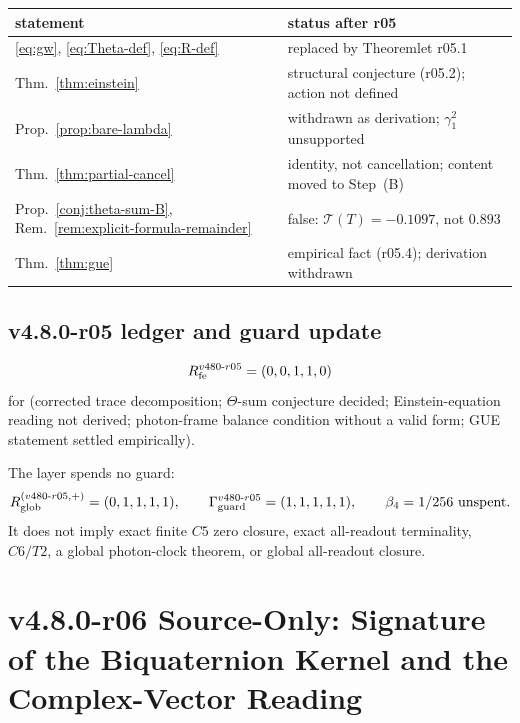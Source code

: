 \begin{center}
\small
\begin{tabular}{@{}>{\raggedright\arraybackslash}p{}>{\raggedright\arraybackslash}p{}@{}}
\toprule
statement & status after r05\\
\midrule
\eqref{eq:gw}, \eqref{eq:Theta-def}, \eqref{eq:R-def} & replaced by Theoremlet r05.1\\
Thm.~\ref{thm:einstein} & structural conjecture (r05.2); action not defined\\
Prop.~\ref{prop:bare-lambda} & withdrawn as derivation; \(\gamma_1^2\) unsupported\\
Thm.~\ref{thm:partial-cancel} & identity, not cancellation; content moved to Step~(B)\\
Prop.~\ref{conj:theta-sum-B}, Rem.~\ref{rem:explicit-formula-remainder} & false: \(\mathcal T(T)=-0.1097\), not \(0.893\)\\
Thm.~\ref{thm:gue} & empirical fact (r05.4); derivation withdrawn\\
\bottomrule
\end{tabular}
\end{center}

\subsection*{v4.8.0-r05 ledger and guard update}
\label{subsec:v480-r05-ledger-guard}

\[
R_{\rm fe}^{v480\text{-}r05}=(0,0,1,1,0)
\]
for (corrected trace decomposition; \(\Theta\)-sum conjecture decided; Einstein-equation reading
not derived; photon-frame balance condition without a valid form; GUE statement settled
empirically).

The layer spends no guard:
\[
R_{\rm glob}^{(v480\text{-}r05,+)}=(0,1,1,1,1),
\qquad
\Gamma_{\rm guard}^{v480\text{-}r05}=(1,1,1,1,1),
\qquad
\beta_4=1/256\ \text{unspent}.
\]
It does not imply exact finite \(C5\) zero closure, exact all-readout terminality,
\(C6/T2\), a global photon-clock theorem, or global all-readout closure.


\clearpage
\section*{v4.8.0-r06 Source-Only: Signature of the Biquaternion Kernel and the Complex-Vector Reading}
\label{sec:v480-r06-complex-vector-reading}

